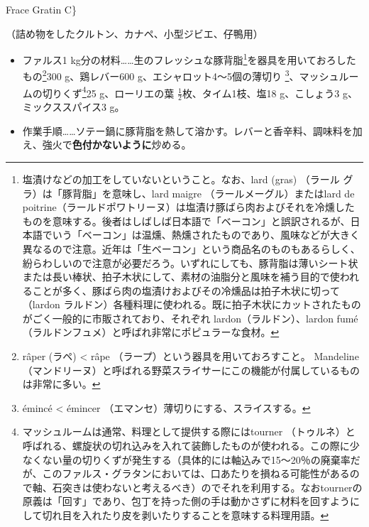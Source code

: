 \begin{recette}
\begin{frsubenv}

Frace Gratin C\}

\end{frsubenv}


（詰め物をしたクルトン、カナペ、小型ジビエ、仔鴨用）

\begin{itemize}
\item
  ファルス1 kg分の材料\ldots{}\ldots{}生のフレッシュな豚背脂\footnote{塩漬けなどの加工をしていないということ。なお、lard
    (gras) （ラール グラ）は「豚背脂」を意味し、lard maigre
    （ラールメーグル）またはlard de
    poitrine（ラールドポワトリーヌ）は塩漬け豚ばら肉およびそれを冷燻したものを意味する。後者はしばしば日本語で「ベーコン」と誤訳されるが、日本語でいう「ベーコン」は温燻、熱燻されたものであり、風味などが大きく異なるので注意。近年は「生ベーコン」という商品名のものもあるらしく、紛らわしいので注意が必要だろう。いずれにしても、豚背脂は薄いシート状または長い棒状、拍子木状にして、素材の油脂分と風味を補う目的で使われることが多く、豚ばら肉の塩漬けおよびその冷燻品は拍子木状に切って（lardon
    ラルドン）各種料理に使われる。既に拍子木状にカットされたものがごく一般的に市販されており、それぞれ
    lardon（ラルドン）、lardon
    fumé（ラルドンフュメ）と呼ばれ非常にポピュラーな食材。}を器具を用いておろしたもの\footnote{râper
    (ラペ) \textless{} râpe （ラープ）という器具を用いておろすこと。
    Mandeline
    （マンドリーヌ）と呼ばれる野菜スライサーにこの機能が付属しているものは非常に多い。}300
  g、鶏レバー600 g、エシャロット4〜5個の薄切り \footnote{émincé
    \textless{} émincer （エマンセ）薄切りにする、スライスする。}、マッシュルームの切りくず\footnote{マッシュルームは通常、料理として提供する際にはtourner
    （トゥルネ）と呼ばれる、螺旋状の切れ込みを入れて装飾したものが使われる。この際に少なくない量の切りくずが発生する（具体的には軸込みで15〜20％の廃棄率だが、このファルス・グラタンにおいては、口あたりを損ねる可能性があるので軸、石突きは使わないと考えるべき）のでそれを利用する。なおtournerの原義は「回す」であり、包丁を持った側の手は動かさずに材料を回すようにして切れ目を入れたり皮を剥いたりすることを意味する料理用語。}25
  g、ローリエの葉 \(\frac{1}{2}\)枚、タイム1枝、塩18 g、こしょう3
  g、ミックススパイス3 g。
\item
  作業手順\ldots{}\ldots{}ソテー鍋に豚背脂を熱して溶かす。レバーと香辛料、調味料を加え、強火で\textbf{色付かないように}炒める。
\end{itemize}


\end{recette}
